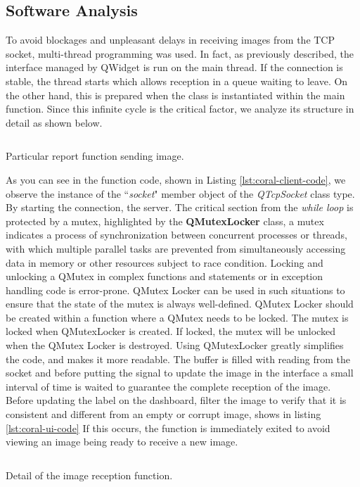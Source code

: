\subsection{Software Analysis}
\label{ssec:software-coral-analysis}
To avoid blockages and unpleasant delays in receiving images from the TCP
socket, multi-thread programming was used. In fact, as previously described, the
interface managed by QWidget is run on the main thread. If the connection is
stable, the thread starts which allows reception in a queue waiting to leave. 
On the other hand, this is prepared when the class is instantiated within the
main function. Since this infinite cycle is the critical factor, we analyze its
structure in detail as shown below.
%
\begin{listing}[ht] 
\inputminted[bgcolor=bg,frame=lines,framesep=2mm, linenos=true, autogobble, breaklines=true, fontsize=\scriptsize, firstline=12, lastline=26]{c++}{software/code/streamerthread.cpp} 
\caption{Particular report function sending image.} 
\label{lst:coral-client-code} 
\end{listing}
%
As you can see in the function code, shown in Listing
\ref{lst:coral-client-code}, we observe the instance of the ``\emph{socket}"
member object of the \emph{QTcpSocket} class type. By starting the connection,
the server. The critical section from the \emph{while loop} is protected by a
mutex, highlighted by the \textbf{QMutexLocker} class, a mutex indicates a
process of synchronization between concurrent processes or threads, with which
multiple parallel tasks are prevented from simultaneously accessing data in
memory or other resources subject to race condition.\cite{wiki:mutex} 
Locking and unlocking a QMutex in complex functions and statements or in
exception handling code is error-prone. 
QMutex Locker can be used in such situations to ensure that the state of the
mutex is always well-defined. QMutex Locker should be created within a function
where a QMutex needs to be locked. The mutex is locked when QMutexLocker is
created. If locked, the mutex will be unlocked when the QMutex Locker is
destroyed.
Using QMutexLocker greatly simplifies the code, and makes it more
readable.\cite{Qt:QMutexclass}
The buffer is filled with reading from the socket and before putting the signal
to update the image in the interface a small interval of time is waited to
guarantee the complete reception of the image.
Before updating the label on the dashboard, filter the image to verify that it
is consistent and different from an empty or corrupt image, shows in listing
\ref{lst:coral-ui-code} If this occurs, the function is immediately exited to
avoid viewing an image being ready to receive a new image. 
%
\begin{listing}[ht] 
\inputminted[bgcolor=bg,frame=lines,framesep=2mm, linenos=true, autogobble, breaklines=true, fontsize=\scriptsize, firstline=88, lastline=100]{c++}{software/code/tcpclient.cpp} 
\caption{Detail of the image reception function.} 
\label{lst:coral-ui-code} 
\end{listing}
%

